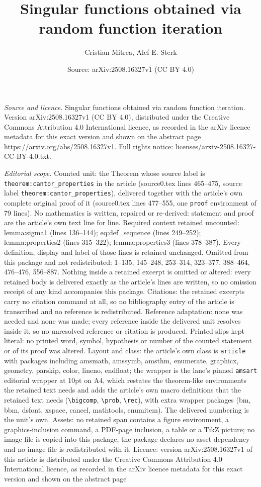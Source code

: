 \documentclass[10pt,a4paper]{amsart}
\title[Singular functions obtained via random function iteration]{Singular functions obtained via random function iteration}
\author{Cristian Mitrea, Alef E. Sterk}
\date{Source: arXiv:2508.16327v1 (CC BY 4.0)}
\begin{document}
\maketitle

\noindent\emph{Source and licence.} Singular functions obtained via random function iteration. Version arXiv:2508.16327v1 (CC BY 4.0), distributed under the Creative Commons Attribution 4.0 International licence, as recorded in the arXiv licence metadata for this exact version and shown on the abstract page https://arxiv.org/abs/2508.16327v1. Full rights notice: licenses/arxiv-2508.16327-CC-BY-4.0.txt.\par\smallskip

\noindent\textit{Editorial scope.} Counted unit: the Theorem whose source label is \texttt{theorem:cantor\_properties} in the article (source0.tex lines 465--475, source label \texttt{theorem:cantor\_properties}), delivered together with the article's own complete original proof of it (source0.tex lines 477--555, one \texttt{proof} environment of 79 lines). No mathematics is written, repaired or re-derived: statement and proof are the article's own text line for line. Required context retained uncounted: lemma:sigma1 (lines 136--144); eq:def\_sequence (lines 249--252); lemma:properties2 (lines 315--322); lemma:properties3 (lines 378--387). Every definition, display and label of those lines is retained unchanged. Omitted from this package and not redistributed: 1--135, 145--248, 253--314, 323--377, 388--464, 476--476, 556--887. Nothing inside a retained excerpt is omitted or altered: every retained body is delivered exactly as the article's lines are written, so no omission receipt of any kind accompanies this package. Citations: the retained excerpts carry no citation command at all, so no bibliography entry of the article is transcribed and no reference is redistributed. Reference adaptation: none was needed and none was made; every reference inside the delivered unit resolves inside it, so no unresolved reference or citation is produced. Printed slips kept literal: no printed word, symbol, hypothesis or number of the counted statement or of its proof was altered. Layout and class: the article's own class is \texttt{article} with packages including amsmath, amssymb, amsthm, enumerate, graphicx, geometry, parskip, color, lineno, endfloat; the wrapper is the lane's pinned \texttt{amsart} editorial wrapper at 10pt on A4, which restates the theorem-like environments the retained text needs and adds the article's own macro definitions that the retained text needs (\texttt{\textbackslash bigcomp}, \texttt{\textbackslash prob}, \texttt{\textbackslash rec}), with extra wrapper packages (bm, bbm, dsfont, xspace, cancel, mathtools, enumitem). The delivered numbering is the unit's own. Assets: no retained span contains a figure environment, a graphics-inclusion command, a PDF-page inclusion, a table or a TikZ picture; no image file is copied into this package, the package declares no asset dependency and no image file is redistributed with it. Licence: version arXiv:2508.16327v1 of this article is distributed under the Creative Commons Attribution 4.0 International licence, as recorded in the arXiv licence metadata for this exact version and shown on the abstract page 
\end{document}
